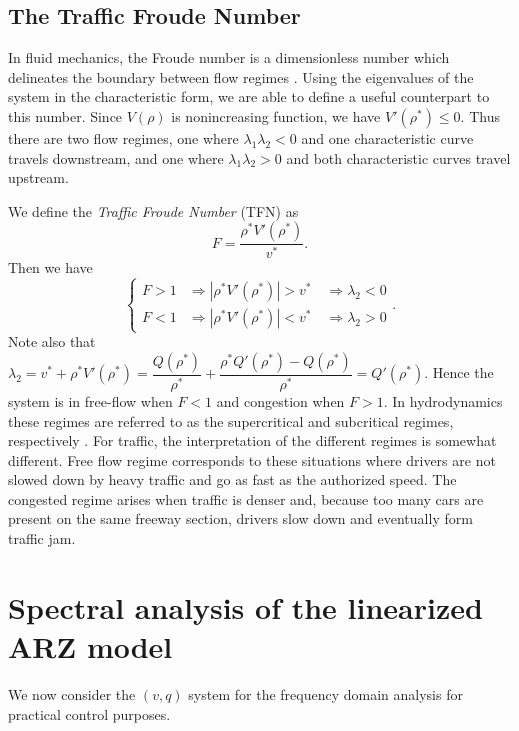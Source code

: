 \documentclass[preprint]{elsarticle}
\begin{document}
\subsection{The Traffic Froude Number}
In fluid mechanics, the Froude number is a dimensionless number which delineates the boundary between flow regimes \cite{Sturm, litrico2009modeling}. Using the eigenvalues of the system in the characteristic form, we are able to define a useful counterpart to this number.
Since $V(\rho)$ is nonincreasing function, we have $V'(\rho^*) \leq 0$. Thus there are two flow regimes, one where $\lambda_1 \lambda_2 < 0$ and one characteristic curve travels downstream, and one where $\lambda_1 \lambda_2 > 0$ and both characteristic curves travel upstream. 

We define the \textit{Traffic Froude Number} (TFN) as
\begin{equation}
F = \dfrac{\rho^*V'( \rho^*)}{v^*}.
\end{equation} 
Then we have
\begin{equation*}
\begin{cases}
F > 1 &\Rightarrow |\rho^*V'(\rho^*)| > v^* \quad \Rightarrow \lambda_2  <0 \\
F < 1 &\Rightarrow |\rho^*V'(\rho^*)| < v^* \quad \Rightarrow \lambda_2 > 0
\end{cases}.
\end{equation*}
Note also that $\lambda_2 = v^* + \rho^* V'( \rho^*) = \dfrac{Q(\rho^*)}{\rho^*} + \dfrac{\rho^*Q'(\rho^*)-Q(\rho^*)}{\rho^*} = Q'(\rho^*)$. Hence the system is in free-flow when $F<1$ and congestion when $F>1$. In hydrodynamics these regimes are referred to as the supercritical and subcritical regimes, respectively \cite{litrico2009modeling}. For traffic, the interpretation of the different regimes is somewhat different. Free flow regime corresponds to these situations where drivers are not slowed down by heavy traffic and go as fast as the authorized speed. The congested regime arises when traffic is denser and, because too many cars are present on the same freeway section, drivers slow down and eventually form traffic jam.


\section{Spectral analysis of the linearized ARZ model}
We now consider the $(v,q)$ system for the frequency domain analysis for practical control purposes.
\end{document}
